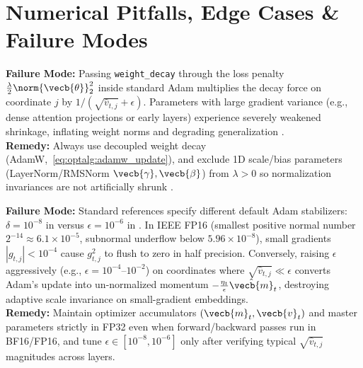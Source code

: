 \documentclass[../../../../master.tex]{subfiles}
\begin{document}
\section{Numerical Pitfalls, Edge Cases \& Failure Modes}
\label{sec:optalg:pitfalls}

\begin{pitfall}
\label{pit:optalg:l2_coupling}
\textbf{Failure Mode:} Passing \texttt{weight\_decay} through the loss penalty $\frac{\lambda}{2}\norm{\vecb{\theta}}_2^2$ inside standard Adam multiplies the decay force on coordinate $j$ by $1/(\sqrt{\hat{v}_{t,j}} + \epsilon)$. Parameters with large gradient variance (e.g., dense attention projections or early layers) experience severely weakened shrinkage, inflating weight norms and degrading generalization .\\
\textbf{Remedy:} Always use decoupled weight decay (AdamW,~\eqref{eq:optalg:adamw_update}), and exclude 1D scale/bias parameters (LayerNorm/RMSNorm $\vecb{\gamma},\vecb{\beta}$) from $\lambda > 0$ so normalization invariances are not artificially shrunk .
\end{pitfall}

\begin{pitfall}
\label{pit:optalg:eps_masking}
\textbf{Failure Mode:} Standard references specify different default Adam stabilizers: $\delta = 10^{-8}$ in  versus $\epsilon = 10^{-6}$ in . In IEEE FP16 (smallest positive normal number $2^{-14} \approx 6.1\times 10^{-5}$, subnormal underflow below $5.96\times 10^{-8}$), small gradients $|g_{t,j}| < 10^{-4}$ cause $g_{t,j}^2$ to flush to zero in half precision. Conversely, raising $\epsilon$ aggressively (e.g., $\epsilon = 10^{-4}$--$10^{-2}$) on coordinates where $\sqrt{\hat{v}_{t,j}} \ll \epsilon$ converts Adam's update into un-normalized momentum $-\frac{\eta_t}{\epsilon}\hat{\vecb{m}}_t$, destroying adaptive scale invariance on small-gradient embeddings.\\
\textbf{Remedy:} Maintain optimizer accumulators $(\vecb{m}_t,\vecb{v}_t)$ and master parameters strictly in FP32 even when forward/backward passes run in BF16/FP16, and tune $\epsilon \in [10^{-8}, 10^{-6}]$ only after verifying typical $\sqrt{\hat{v}_{t,j}}$ magnitudes across layers.
\end{pitfall}
\end{document}
